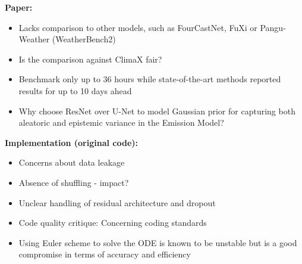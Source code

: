 \documentclass[landscape,a1paper,fontscale=0.424]{baposter}
\begin{document}
\begin{poster}
{        \begin{minipage}[t]{0.48\textwidth}
            \textbf{\color{blue}Paper:}
            \begin{itemize}
                \item Lacks comparison to other models, such as FourCastNet, FuXi or Pangu-Weather (WeatherBench2)
                \item Is the comparison against ClimaX fair?
                \item Benchmark only up to 36 hours while state-of-the-art methods reported results for up to 10 days ahead
                \item Why choose ResNet over U-Net to model Gaussian prior for capturing both aleatoric and epistemic variance in the Emission Model?
            \end{itemize}
        \end{minipage}\hfill\begin{minipage}[t]{0.48\textwidth}
            \textbf{\color{blue}Implementation (original code):}
            \begin{itemize}
                \item Concerns about data leakage
                \item Absence of shuffling - impact?
                \item Unclear handling of residual architecture and dropout
                \item Code quality critique: Concerning coding standards
                \item Using Euler scheme to solve the ODE is known to be unstable but is a good compromise in terms of accuracy and efficiency
            \end{itemize}
        \end{minipage}
    }
\end{poster}
\end{document}
